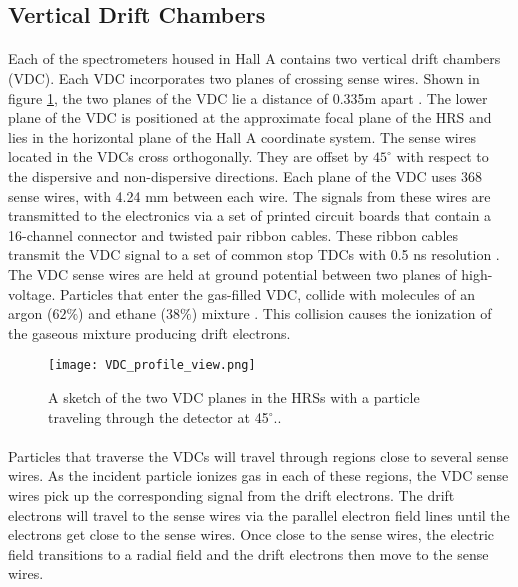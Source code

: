 	\subsection{Vertical Drift Chambers}\label{sec:vdc}
	\paragraph{}Each of the spectrometers housed in Hall A contains two vertical drift chambers (VDC). Each VDC incorporates two planes of crossing sense wires. Shown in figure \ref{VDC_profile}, the two planes of the VDC lie a distance of 0.335m apart \cite{drift}. The lower plane of the VDC is positioned at the approximate focal plane of the HRS and lies in the horizontal plane of the Hall A coordinate system. The sense wires located in the VDCs cross orthogonally. They are offset by $45^\circ$ with respect to the dispersive and non-dispersive directions. Each plane of the VDC uses 368 sense wires, with 4.24 mm between each wire. The signals from these wires are transmitted to the electronics via a set of printed circuit boards that contain a 16-channel connector and twisted pair ribbon cables. These ribbon cables transmit the VDC signal to a set of common stop TDCs with 0.5 ns resolution \cite{drift}. The VDC sense wires are held at ground potential between two planes of high-voltage. Particles that enter the gas-filled VDC, collide with molecules of an argon ($62\%$) and ethane ($38\%$) mixture \cite{HallA}. This collision causes the ionization of the gaseous mixture producing drift electrons.
	\begin{figure}[t]
		\centering
		\texttt{[image: VDC\_profile\_view.png]}
		\caption{A sketch of the two VDC planes in the HRSs with a particle traveling through the detector at 45$^\circ$.\cite{drift}.
			\label{VDC_profile}}
	\end{figure}
	\paragraph{} Particles that traverse the VDCs will travel through regions close to several sense wires. As the incident particle ionizes gas in each of these regions, the VDC sense wires pick up the corresponding signal from the drift electrons. The drift electrons will travel to the sense wires via the parallel electron field lines until the electrons get close to the sense wires. Once close to the sense wires, the electric field transitions to a radial field and the drift electrons then move to the sense wires.

